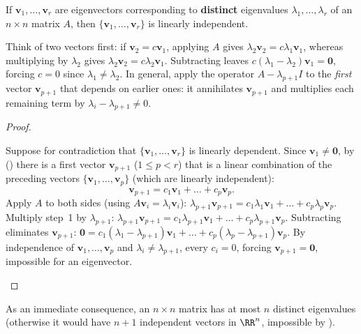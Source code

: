 \documentclass[10pt]{scrartcl}
\newcommand{\vv}[1]{\mathbf{#1}}
\begin{document}
\begin{theorem*}
  If $\vv v_1,\dots,\vv v_r$ are eigenvectors corresponding to \textbf{distinct} eigenvalues $\lambda_1,\dots,\lambda_r$ of an $n\times n$ matrix $A$, then $\{\vv v_1,\dots,\vv v_r\}$ is linearly independent.
\end{theorem*}
\begin{ideabox}
  Think of two vectors first: if $\vv v_2=c\vv v_1$, applying $A$ gives $\lambda_2\vv v_2=c\lambda_1\vv v_1$, whereas multiplying by $\lambda_2$ gives $\lambda_2\vv v_2=c\lambda_2\vv v_1$. Subtracting leaves $c(\lambda_1-\lambda_2)\vv v_1=\vv 0$, forcing $c=0$ since $\lambda_1\ne\lambda_2$. In general, apply the operator $A-\lambda_{p+1}I$ to the \emph{first} vector $\vv v_{p+1}$ that depends on earlier ones: it annihilates $\vv v_{p+1}$ and multiplies each remaining term by $\lambda_i-\lambda_{p+1}\neq0$.
\end{ideabox}
\begin{proof}
  \begin{steps}
    \ii Suppose for contradiction that $\{\vv v_1,\dots,\vv v_r\}$ is linearly dependent. Since $\vv v_1\ne\vv 0$, by () there is a first vector $\vv v_{p+1}$ ($1\le p<r$) that is a linear combination of the preceding vectors $\{\vv v_1,\dots,\vv v_p\}$ (which are linearly independent):
    \[
      \vv v_{p+1} = c_1\vv v_1 + \dots + c_p\vv v_p.
    \]
    \ii Apply $A$ to both sides (using $A\vv v_i=\lambda_i\vv v_i$): $\lambda_{p+1}\vv v_{p+1}=c_1\lambda_1\vv v_1+\dots+c_p\lambda_p\vv v_p$.
    \ii Multiply step~1 by $\lambda_{p+1}$: $\lambda_{p+1}\vv v_{p+1}=c_1\lambda_{p+1}\vv v_1+\dots+c_p\lambda_{p+1}\vv v_p$.
    \ii Subtracting eliminates $\vv v_{p+1}$: $\vv 0 = c_1(\lambda_1-\lambda_{p+1})\vv v_1+\dots+c_p(\lambda_p-\lambda_{p+1})\vv v_p$. By independence of $\vv v_1,\dots,\vv v_p$ and $\lambda_i\ne\lambda_{p+1}$, every $c_i=0$, forcing $\vv v_{p+1}=\vv 0$, impossible for an eigenvector.
  \end{steps}
\end{proof}

As an immediate consequence, an $n\times n$ matrix has at most $n$ distinct eigenvalues (otherwise it would have $n+1$ independent vectors in $\RR^n$, impossible by ).
\end{document}
